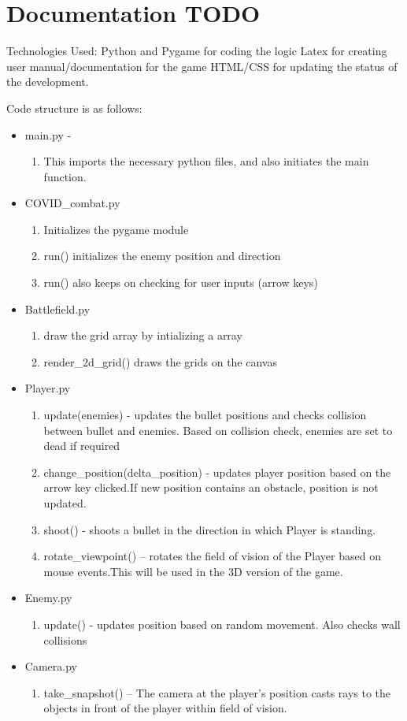\section{Documentation TODO}
Technologies Used: Python and Pygame for coding the logic
Latex for creating user manual/documentation for the game
HTML/CSS for updating the status of the development.

Code structure is as follows:
\begin{itemize}
  \item main.py - 
      \begin{enumerate}
      \item This imports the necessary python files, and also initiates the main function.
  \end{enumerate}
  \item COVID\_combat.py 
      \begin{enumerate}
      \item Initializes the pygame module
      \item run() initializes the enemy position and direction
      \item run() also keeps on checking for user inputs (arrow keys)
      \end{enumerate}
  \item Battlefield.py
    \begin{enumerate}
      \item draw the grid array by intializing a array
      \item render\_2d\_grid() draws the grids on the canvas
      \end{enumerate}
   \item Player.py
    \begin{enumerate}
      \item update(enemies) - updates the bullet positions and checks collision between bullet and enemies. Based on collision check, enemies are set to dead if required
      \item change\_position(delta\_position) - updates player position based on the arrow key clicked.If new position contains an obstacle, position is not updated.
     \item shoot() - shoots a bullet in the direction in which Player is standing.
     \item rotate\_viewpoint() -- rotates the field of vision of the Player based on mouse events.This will be used in the 3D version of the game.
      \end{enumerate}
    \item Enemy.py
    \begin{enumerate}
      \item update() - updates position based on random movement. Also checks wall collisions
      \end{enumerate}
    \item Camera.py
    \begin{enumerate}
      \item take\_snapshot() -- The camera at the player's position casts rays to the objects in front of the player within field of vision.


\end{enumerate}
\end{itemize}

